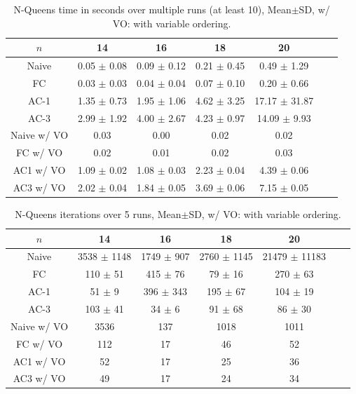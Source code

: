 \begin{table}[h!]
	\centering
	\begin{tabular}{|c|c|c|c|c|c|c|}
		\hline
		$n$         & 14              & 16              & 18              & 20                \\ \hline
		Naive       & 0.05 $\pm$ 0.08 & 0.09 $\pm$ 0.12 & 0.21 $\pm$ 0.45 & 0.49 $\pm$ 1.29   \\ \hline
		FC          & 0.03 $\pm$ 0.03 & 0.04 $\pm$ 0.04 & 0.07 $\pm$ 0.10 & 0.20 $\pm$ 0.66   \\ \hline
		AC-1        & 1.35 $\pm$ 0.73 & 1.95 $\pm$ 1.06 & 4.62 $\pm$ 3.25 & 17.17 $\pm$ 31.87 \\ \hline
		AC-3        & 2.99 $\pm$ 1.92 & 4.00 $\pm$ 2.67 & 4.23 $\pm$ 0.97 & 14.09 $\pm$ 9.93  \\ \hline
		Naive w/ VO & 0.03            & 0.00            & 0.02            & 0.02              \\ \hline
		FC w/ VO    & 0.02            & 0.01            & 0.02            & 0.03              \\ \hline
		AC1 w/ VO   & 1.09 $\pm$ 0.02 & 1.08 $\pm$ 0.03 & 2.23 $\pm$ 0.04 & 4.39 $\pm$ 0.06   \\ \hline
		AC3 w/ VO   & 2.02 $\pm$ 0.04 & 1.84 $\pm$ 0.05 & 3.69 $\pm$ 0.06 & 7.15 $\pm$ 0.05   \\ \hline
	\end{tabular}
	\caption{N-Queens time in seconds over multiple runs (at least 10), Mean$\pm$SD, w/ VO: with variable ordering.}
	\label{tab:queens:time}
\end{table}

\begin{table}[h!]
	\centering
	\begin{tabular}{|c|c|c|c|c|c|c|}
		\hline
		$n$         & 14              & 16             & 18              & 20                \\ \hline
		Naive       & 3538 $\pm$ 1148 & 1749 $\pm$ 907 & 2760 $\pm$ 1145 & 21479 $\pm$ 11183 \\ \hline
		FC          & 110 $\pm$ 51    & 415 $\pm$ 76   & 79 $\pm$ 16     & 270 $\pm$ 63      \\ \hline
		AC-1        & 51 $\pm$ 9      & 396 $\pm$ 343  & 195 $\pm$ 67    & 104 $\pm$ 19      \\ \hline
		AC-3        & 103 $\pm$ 41    & 34 $\pm$ 6     & 91 $\pm$ 68     & 86 $\pm$ 30       \\ \hline
		Naive w/ VO & 3536            & 137            & 1018            & 1011              \\ \hline
		FC w/ VO    & 112             & 17             & 46              & 52                \\ \hline
		AC1 w/ VO   & 52              & 17             & 25              & 36                \\ \hline
		AC3 w/ VO   & 49              & 17             & 24              & 34                \\ \hline
	\end{tabular}
	\caption{N-Queens iterations over 5 runs, Mean$\pm$SD, w/ VO: with variable ordering.}
	\label{tab:queens:iterations}
\end{table}

